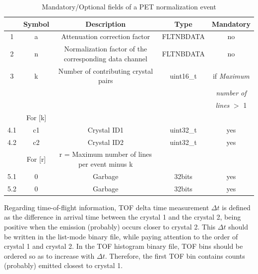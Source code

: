 \documentclass[a4paper, 11pt]{article}
\begin{document}
\begin{table} [h!]
  \small
  \caption{Mandatory/Optional fields of a PET normalization event}
  \label{table_PET_data_bin_normalization}
  \begin{center}
  \begin{tabular}{|c|c|c|c|c|}
  \hline
   & \textbf{Symbol} & \textbf{Description} & \textbf{Type} & \textbf{Mandatory}\\
  \hline
  \hline
  1 & a & Attenuation correction factor & FLTNBDATA & no \\ \hline
  2 & n & Normalization factor of the corresponding data channel & FLTNBDATA & no \\ \hline
  3 & k & Number of contributing crystal pairs & uint16\_t & if \textit{Maximum} \\
    & & & &                                                     \textit{number of} \\
    & & & &                                                     \textit{lines} $>$ 1 \\ \hline
  \cellcolor{blue!25}& \cellcolor{blue!25}For [k]&\cellcolor{blue!25}&\cellcolor{blue!25}&\cellcolor{blue!25} \\ \hline
  4.1 & c1 & Crystal ID1 & uint32\_t & yes \\ \hline
  4.2 & c2 & Crystal ID2 & uint32\_t & yes \\ \hline
  \cellcolor{blue!25}& \cellcolor{blue!25}For [r]& \cellcolor{blue!25}r = Maximum number of lines per event minus k & \cellcolor{blue!25}&\cellcolor{blue!25}  \\ \hline
  5.1 & 0 & Garbage & 32bits & yes \\ \hline
  5.2 & 0 & Garbage & 32bits & yes \\ \hline
  \end{tabular}
  \end{center}
\end{table}

Regarding time-of-flight information, TOF delta time measurement $\Delta t$ is defined as the difference in arrival time between the crystal 1 and the crystal 2, being positive when the emission (probably) occurs closer to crystal 2. This $\Delta t$ should be written in the list-mode binary file, while paying attention to the order of crystal 1 and crystal 2. In the TOF histogram binary file, TOF bins should be ordered so as to increase with $\Delta t$. Therefore, the first TOF bin contains counts (probably) emitted closest to crystal 1.
\end{document}
